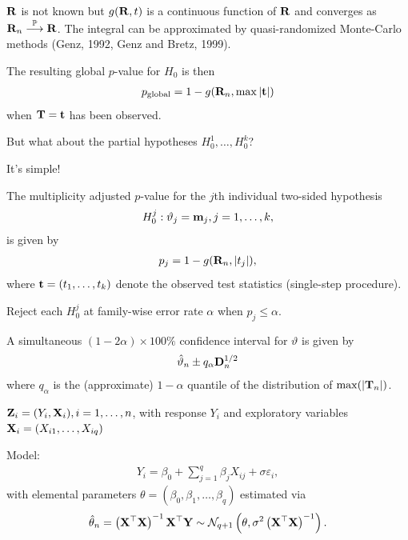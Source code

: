 \documentclass[landscape]{slides}
\begin{document}
$\Cor$ is not known but $g(\Cor, t)$ is a continuous function of $\Cor$ 
and converges as $\Cor_n \cP \Cor$. The integral can be approximated
by quasi-randomized Monte-Carlo methods (Genz, 1992, Genz and Bretz, 1999).

The resulting global $p$-value 
for $H_0$ is then 
\begin{eqnarray*}
p_\text{global} = 1 - g(\Cor_n, \max|\tt|)
\end{eqnarray*}
when $\T = \tt$ has been observed.


But what about the partial hypotheses $H_0^1, \ldots, H_0^k$?

It's simple!

The multiplicity adjusted $p$-value for the $j$th
individual two-sided hypothesis 
\begin{eqnarray*}
H_0^j: \vartheta_j = \m_j, j = 1, \dots, k,
\end{eqnarray*}
is given by 
\begin{eqnarray*}
p_j = 1 - g(\Cor_n, |t_j|),
\end{eqnarray*}
where $\tt = (t_1, \dots, t_k)$ denote the observed test statistics (single-step procedure).

Reject each $H_0^j$ at family-wise error rate $\alpha$ when $p_j \leq \alpha$.


A simultaneous $(1 - 2\alpha)
\times 100\%$ confidence interval for $\vartheta$ is given by 
\begin{eqnarray*}
\hat{\vartheta}_n \pm q_\alpha \D_n^{1/2}
\end{eqnarray*}
where $q_\alpha$ is the (approximate) $1 - \alpha$ quantile of the distribution of $\max(|\T_n|)$.


$\Z_i = (Y_i, \X_i), i = 1, \dots, n$, with response $Y_i$
and exploratory variables \\ $\X_i = (X_{i1}, \dots, X_{iq})$

Model:
\begin{eqnarray*}
Y_i = \beta_0 + \sum_{j = 1}^q \beta_j X_{ij} + \sigma \varepsilon_i,
\end{eqnarray*}
with elemental parameters $\theta = (\beta_0, \beta_1, \dots, \beta_q)$
estimated via
\begin{eqnarray*}
\hat{\theta}_n = \left(\X^\top\X\right)^{-1} \X^\top \Y \sim \N%
_{q+1}\left(\theta, \sigma^2 \left(\X^\top\X\right)^{-1}\right).
\end{eqnarray*}
\end{document}
